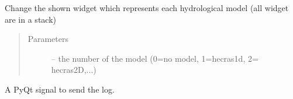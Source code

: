 \documentclass[letterpaper,10pt,english]{sphinxmanual}
\begin{document}
\begin{fulllineitems}
\begin{fulllineitems}
\label{\detokenize{index:src_GUI.hydro_GUI_2.Hydro2W.selectionchange}}
Change the shown widget which represents each hydrological model (all widget are in a stack)
\begin{quote}\begin{description}
\item[{Parameters}] \leavevmode
{} -- the number of the model (0=no model, 1=hecras1d, 2= hecras2D,...)

\end{description}\end{quote}

\end{fulllineitems}


\begin{fulllineitems}
\label{\detokenize{index:src_GUI.hydro_GUI_2.Hydro2W.send_log}}
A PyQt signal to send the log.

\end{fulllineitems}


\end{fulllineitems}

\end{document}
